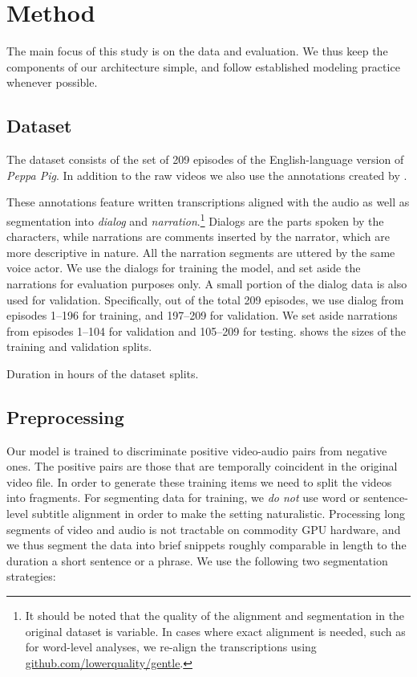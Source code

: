 \section{Method}
\label{sec:method}

The main focus of this study is on the data and evaluation. We thus
keep the components of our architecture simple, and follow established
modeling practice whenever possible.

\subsection{Dataset}
The dataset consists of the set of 209 episodes of the
English-language version of {\it Peppa Pig}. In addition to the raw
videos we  also use the annotations created by
\citet{papasarantopoulos2021narration}.

These annotations feature written transcriptions aligned with the
audio as well as segmentation into {\it dialog} and {\it
  narration}.\footnote{It should be noted that the quality of the
  alignment and segmentation in the original dataset is variable. In
  cases where exact alignment is needed, such as for word-level
  analyses, we re-align the transcriptions using
  \url{github.com/lowerquality/gentle}.}  Dialogs are the parts spoken
by the characters, while narrations are comments inserted by the
narrator, which are more descriptive in nature. All the narration
segments are uttered by the same voice actor. We use the dialogs for
training the model, and set aside the narrations for evaluation
purposes only. A small portion of the dialog data is also used for
validation.  Specifically, out of the total 209 episodes, we use
dialog from episodes 1--196 for training, and 197--209 for
validation. We set aside narrations from episodes 1--104 for
validation and 105--209 for testing. 
shows the sizes of the training and validation splits.

\begin{table}[htb]
  \centering 
  \caption{Duration in hours of the dataset splits.}
  \label{tab:ds-stat}
\end{table}


\subsection{Preprocessing}
Our model is trained to discriminate positive video-audio pairs from
negative ones.  The positive pairs are those that are temporally
coincident in the original video file. In order to generate these
training items we need to split the videos into fragments.  For
segmenting data for training, we \emph{do not} use word or
sentence-level subtitle alignment in order to make the setting
naturalistic. Processing long segments of video and audio is not
tractable on commodity GPU hardware, and we thus segment the data into
brief snippets roughly comparable in length to the duration a short
sentence or a phrase. We use the following two segmentation
strategies:

